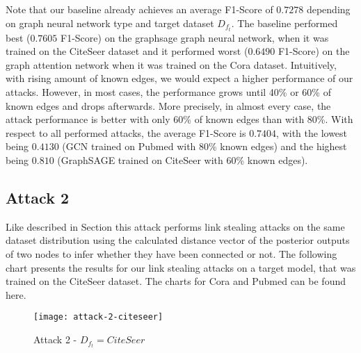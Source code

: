             Note that our baseline already achieves an average F1-Score of $0.7278$ depending on graph neural network type and target dataset $D_{f_t}$.
            The baseline performed best ($0.7605$ F1-Score) on the graphsage graph neural network, when it was trained on the  CiteSeer dataset and it performed worst ($0.6490$ F1-Score) on the graph attention network when it was trained on the Cora dataset.
            Intuitively, with rising amount of known edges, we would expect a higher performance of our attacks.
            However, in most cases, the performance grows until 40\% or 60\% of known edges and drops afterwards.
            More precisely, in almost every case, the attack performance is better with only 60\% of known edges than with 80\%.
            With respect to all performed attacks, the average F1-Score is $0.7404$, with the lowest being $0.4130$ (GCN trained on Pubmed with 80\% known edges) and the highest being $0.810$ (GraphSAGE trained on CiteSeer with 60\% known edges).

        \subsection*{Attack 2}
            Like described in Section  this attack performs link stealing attacks on the same dataset distribution using the calculated distance vector of the posterior outputs of two nodes to infer whether they have been connected or not. 
            The following chart presents the results for our link stealing attacks on a target model, that was trained on the CiteSeer dataset.
            The charts for Cora and Pubmed can be found here. 

            \begin{figure}[h]
                \begin{center}
                    \texttt{[image: attack-2-citeseer]}
                    \caption{Attack 2 - $D_{f_t} = CiteSeer$}
                    \label{figure:eval-att2-citeseer}
                \end{center}
            \end{figure}


